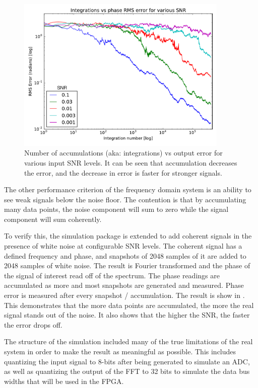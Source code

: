 \begin{figure}
  \centering
  \includegraphics[width=0.9\textwidth]{integration-vs-error-combined-5}
  \caption{Number of accumulations (aka: integrations) vs output error for various input SNR levels. It can be seen that accumulation decreases the error, and the decrease in error is faster for stronger signals.}
  \label{fig:system-design-integration-vs-error}
\end{figure}

The other performance criterion of the frequency domain system is an ability to see weak signals below the noise floor. The contention is that by accumulating many data points, the noise component will sum to zero while the signal component will sum coherently.

To verify this, the simulation package is extended to add coherent signals in the presence of white noise at configurable SNR levels. The coherent signal has a defined frequency and phase, and snapshots of 2048 samples of it are added to 2048 samples of white noise. The result is Fourier transformed and the phase of the signal of interest read off of the spectrum. The phase readings are accumulated as more and most snapshots are generated and measured. Phase error is measured after every snapshot / accumulation. The result is show in . This demonstrates that the more data points are accumulated, the more the real signal stands out of the noise. It also shows that the higher the SNR, the faster the error drops off. 

The structure of the simulation included many of the true limitations of the real system in order to make the result as meaningful as possible. This includes quantizing the input signal to 8-bits after being generated to simulate an ADC, as well as quantizing the output of the FFT to 32 bits to simulate the data bus widths that will be used in the FPGA.\\

